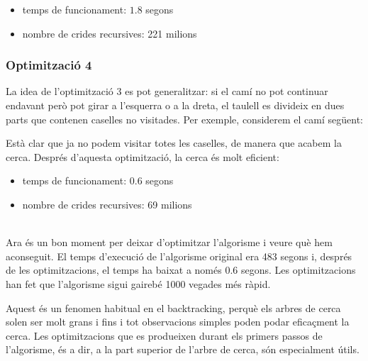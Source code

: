 \begin{itemize}
\item
temps de funcionament: $1.8$ segons
\item
nombre de crides recursives: 221 milions
\end{itemize}

\subsubsection{Optimització 4}

La idea de l'optimització 3
es pot generalitzar:
si el camí no pot continuar endavant
però pot girar a l'esquerra o a la dreta,
el taulell es divideix en dues parts
que contenen caselles no visitades.
Per exemple, considerem el camí següent:

\begin{center}
\end{center}
Està clar que ja no podem visitar totes les caselles,
de manera que acabem la cerca. Després d'aquesta optimització,
la cerca és molt eficient:

\begin{itemize}
\item
temps de funcionament: $0.6$ segons
\item
nombre de crides recursives: 69 milions
\end{itemize}

~\\
Ara és un bon moment per deixar d'optimitzar
l'algorisme i veure què hem aconseguit.
El temps d'execució de l'algorisme original
era 483 segons i, després de les optimitzacions,
el temps ha baixat a només $0.6$ segons.
Les optimitzacions han fet que l'algorisme sigui
gairebé 1000 vegades més ràpid.

Aquest és un fenomen habitual en el backtracking,
perquè els arbres de cerca solen ser molt grans
i fins i tot observacions simples poden podar eficaçment
la cerca.
Les optimitzacions que es produeixen durant els primers
passos de l'algorisme, és a dir, a la part superior de
l'arbre de cerca, són especialment útils.

